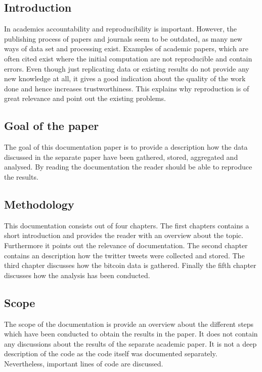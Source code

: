 \documentclass[a4paper,12pt]{article}
\begin{document}
    \clearpage
    \tableofcontents
    
    \clearpage
    
    \listoffigures
    
    \clearpage

\begin{spacing}{1.2}
\cleardoublepage{}
\section{Introduction}
In academics accountability and reproducibility is important. However, the publishing process of papers and journals seem to be outdated, as many new ways of data set and processing exist. Examples of academic papers, which are often cited exist where the initial computation are not reproducible and contain errors. Even though just replicating data or existing results do not provide any new knowledge at all, it gives a good indication about the quality of the work done and hence increases trustworthiness. This explains why reproduction is of great relevance and point out the existing problems.

\subsection{Goal of the paper}
The goal of this documentation paper is to provide a description how the data discussed in the separate paper have been gathered, stored, aggregated and analysed. By reading the documentation the reader should be able to reproduce the results.

\subsection{Methodology}
This documentation consists out of four chapters. The first chapters contains a short introduction and provides the reader with an overview about the topic. Furthermore it points out the relevance of documentation. The second chapter contains an description how the twitter tweets were collected and stored. The third chapter discusses how the bitcoin data is gathered. Finally the fifth chapter discusses how the analysis has been conducted.

\subsection{Scope}
The scope of the documentation is provide an overview about the different steps which have been conducted to obtain the results in the paper. It does not contain any discussions about the results of the separate academic paper. It is not a deep description of the code as the code itself was documented separately. Nevertheless, important lines of code are discussed. 
\clearpage 



\end{spacing}
\end{document}
